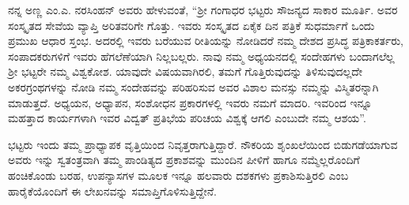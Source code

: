 {ನನ್ನ ಅಣ್ಣ ಎಂ.ಎ. ನರಸಿಂಹನ್ ಅವರು ಹೇಳುವಂತೆ, “ಶ್ರೀ ಗಂಗಾಧರ ಭಟ್ಟರು ಸೌಜನ್ಯದ ಸಾಕಾರ ಮೂರ್ತಿ. ಅವರ ಸಂಸ್ಕೃತದ ಸೇವೆಯ ವ್ಯಾಪ್ತಿ ಅರಿತವರಿಗೇ ಗೊತ್ತು. ಇವರು ಸಂಸ್ಕೃತದ ಏಕೈಕ ದಿನ ಪತ್ರಿಕೆ ಸುಧರ್ಮಾಗೆ ಒಂದು ಪ್ರಮುಖ ಆಧಾರ ಸ್ತಂಭ. ಅದರಲ್ಲಿ ಇವರು ಬರೆಯುವ ರೀತಿಯನ್ನು ನೋಡಿದರೆ ನಮ್ಮ ದೇಶದ ಪ್ರಸಿದ್ಧ ಪತ್ರಿಕಾ\-ಕರ್ತರು, ಸಂಪಾದಕರುಗಳಿಗೆ ಇವರು ಹೆಗಲೆಣೆಯಾಗಿ ನಿಲ್ಲಬಲ್ಲರು. ನಾವು ನಮ್ಮ ಅಧ್ಯಯನ\-ದಲ್ಲಿ ಸಂದೇಹಗಳು ಬಂದಾಗಲೆಲ್ಲ ಶ್ರೀ ಭಟ್ಟರೇ ನಮ್ಮ ವಿಶ್ವಕೋಶ. ಯಾವುದೇ ವಿಷಯವಾಗಿರಲಿ, ತಮಗೆ ಗೊತ್ತಿರುವುದನ್ನು ತಿಳಿಸುವುದಲ್ಲದೇ ಅಕರ\-ಗ್ರಂಥಗಳನ್ನು ನೋಡಿ ನಮ್ಮ ಸಂದೇಹವನ್ನು ಪರಿಹರಿಸುವ ಅವರ ವಿಶಾಲ ಮನಸ್ಸು ನಮ್ಮನ್ನು ವಿಸ್ಮಿತರನ್ನಾಗಿ ಮಾಡುತ್ತದೆ. ಅಧ್ಯಯನ, ಅಧ್ಯಾಪನ, ಸಂಶೋಧನ ಪ್ರಕಾರ\-ಗಳಲ್ಲಿ ಇವರು ನಮಗೆ ಮಾದರಿ. ಇವರಿಂದ ಇನ್ನೂ ಮಹತ್ತಾದ ಕಾರ್ಯಗಳಾಗಿ ಇವರ ವಿದ್ವತ್ ಪ್ರತಿಭೆಯ ಪರಿಚಯ ವಿಶ್ವಕ್ಕೆ ಆಗಲಿ ಎಂಬುದೇ ನಮ್ಮ ಆಶಯ”. 

ಭಟ್ಟರು ಇಂದು ತಮ್ಮ ಪ್ರಾಧ್ಯಾಪಕ ವೃತ್ತಿಯಿಂದ ನಿವೃತ್ತರಾಗುತ್ತಿದ್ದಾರೆ. ನೌಕರಿಯ ಶೃಂಖಲೆಯಿಂದ ಬಿಡುಗಡೆಯಾಗುವ ಅವರು ಇನ್ನು ಸ್ವತಂತ್ರವಾಗಿ ತಮ್ಮ ಪಾಂಡಿತ್ಯದ ಪ್ರಕಾಶವನ್ನು ಮುಂದಿನ ಪೀಳಿಗೆ ಹಾಗೂ ನಮ್ಮೆಲ್ಲರೊಂದಿಗೆ ಹಂಚಿಕೊಂಡು ಬರಹ, ಉಪನ್ಯಾಸಗಳ ಮೂಲಕ ಇನ್ನೂ ಹಲವಾರು ದಶಕಗಳು ಪ್ರಕಾಶಿಸುತ್ತಿರಲಿ ಎಂಬ ಹಾರೈಕೆ\-ಯೊಂದಿಗೆ ಈ ಲೇಖನವನ್ನು ಸಮಾಪ್ತಿಗೊಳಿಸುತ್ತಿದ್ದೇನೆ.

\articleend
}
